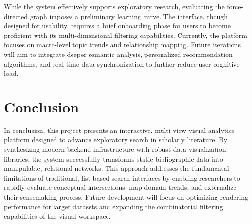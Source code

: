 \documentclass[sigconf]{acmart}
\begin{document}
While the system effectively supports exploratory research, evaluating the force-directed graph imposes a preliminary learning curve. The interface, though designed for usability, requires a brief onboarding phase for users to become proficient with its multi-dimensional filtering capabilities. Currently, the platform focuses on macro-level topic trends and relationship mapping. Future iterations will aim to integrate deeper semantic analysis, personalized recommendation algorithms, and real-time data synchronization to further reduce user cognitive load.

\section{Conclusion}
In conclusion, this project presents an interactive, multi-view visual analytics platform designed to advance exploratory search in scholarly literature. By synthesizing modern backend infrastructure with robust data visualization libraries, the system successfully transforms static bibliographic data into manipulable, relational networks. This approach addresses the fundamental limitations of traditional, list-based search interfaces by enabling researchers to rapidly evaluate conceptual intersections, map domain trends, and externalize their sensemaking process. Future development will focus on optimizing rendering performance for larger datasets and expanding the combinatorial filtering capabilities of the visual workspace.



\end{document}
